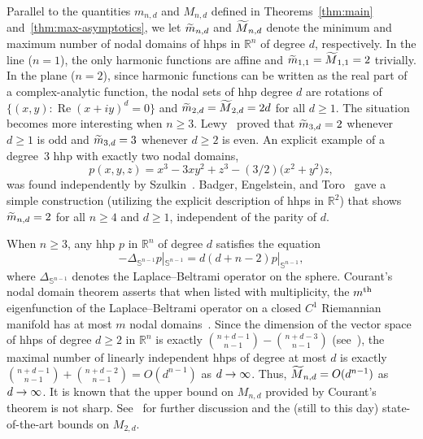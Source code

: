 \documentclass[10pt]{amsart}
\theoremstyle{definition}\newtheorem{defi}[theo]{Definition}\newtheorem{rema}[theo]{Remark}\newtheorem{exam}[theo]{Example}\newtheorem{exem}[theo]{Example}\newtheorem{nota}[theo]{Notation}
\DeclareMathOperator{\Ree}{Re}
\newcommand{\R}{\mathbb{R}}
\newcommand{\sphere}{\mathbb{S}}
\let\oldtilde\tilde
\renewcommand*{\tilde}[1]{\mathchoice{\widetilde{#1}}{\widetilde{#1}}{\oldtilde{#1}}{\oldtilde{#1}}}
\renewcommand*{\to}{\mathchoice{\longrightarrow}{\rightarrow}{\rightarrow}{\rightarrow}}
\begin{document}
Parallel to the quantities $m_{n,d}$ and $M_{n,d}$ defined in Theorems~\ref{thm:main} and~\ref{thm:max-asymptotics}, we let $\tilde m_{n,d}$ and $\tilde M_{n,d}$ denote the minimum and maximum number of nodal domains of hhps in $\R^n$ of degree $d$, respectively. In the line ($n=1$), the only harmonic functions are affine and $\tilde m_{1,1}=\tilde M_{1,1}=2$ trivially. In the plane ($n=2$), since harmonic functions can be written as the real part of a complex-analytic function, the nodal sets of hhp degree $d$ are rotations of $\{(x,y):\Ree(x+iy)^d=0\}$ and $\tilde m_{2,d}=\tilde M_{2,d}=2d$ for all $d\geq 1$. The situation becomes more interesting when $n\geq 3$. Lewy~\cite{Lewy77} proved that $\tilde m_{3,d}=2$ whenever $d\geq 1$ is odd and $\tilde m_{3,d}=3$ whenever $d\geq 2$ is even. An explicit example of a degree~3 hhp with exactly two nodal domains,
\begin{equation}
p(x,y,z) = x^3 - 3xy^2 + z^3 - (3/2)\bigl(x^2 + y^2\bigr)z,
\end{equation}
was found independently by Szulkin~\cite{Szulkin78}. Badger, Engelstein, and Toro~\cite{BET17} gave a simple construction (utilizing the explicit description of hhps in $\R^2$) that shows $\tilde m_{n,d}=2$ for all $n\geq 4$ and $d\geq 1$, independent of the parity of $d$.

When $n\geq 3$, any hhp $p$ in $\R^n$ of degree $d$ satisfies the equation
\[
-\Delta_{\sphere^{n-1}} p|_{\sphere^{n-1}} = d(d+n-2)p|_{\sphere^{n-1}},
\]
where $\Delta_{\sphere^{n-1}}$ denotes the Laplace--Beltrami operator on the sphere. Courant's nodal domain theorem asserts that when listed with multiplicity, the $m^{\rm th}$ eigenfunction of the Laplace--Beltrami operator on a closed $C^1$ Riemannian manifold has at most $m$ nodal domains~\cite{CH,local-courant}. Since the dimension of the vector space of hhps of degree $d \ge 2$ in $\R^n$ is exactly $\binom{n+d-1}{n-1} - \binom{n+d-3}{n-1}$ (see~\cite[Proposition~5.8]{ABR}), the maximal number of linearly independent hhps of degree at most $d$ is exactly $\binom{n+d-1}{n-1} + \binom{n+d-2}{n-1}=O(d^{n-1})$ as $d\to\infty$. Thus, $\tilde M_{n,d}=O(d^{n-1})$ as $d\to\infty$. It is known that the upper bound on $M_{n,d}$ provided by Courant's theorem is not sharp. See~\cite{Leydold96} for further discussion and the (still to this day) state-of-the-art bounds on $M_{2,d}$.
\end{document}
